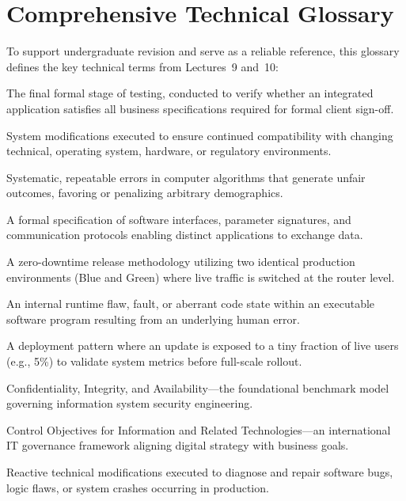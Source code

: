 \documentclass[11pt,a4paper]{article}
\begin{document}
\section{Comprehensive Technical Glossary}
\label{sec:glossary}

To support undergraduate revision and serve as a reliable reference, this glossary defines the key technical terms from Lectures~9 and~10:

\begin{description}[leftmargin=!,labelwidth=4.5cm]
    \item[Acceptance Testing] The final formal stage of testing, conducted to verify whether an integrated application satisfies all business specifications required for formal client sign-off.
    \item[Adaptive Maintenance] System modifications executed to ensure continued compatibility with changing technical, operating system, hardware, or regulatory environments.
    \item[Algorithmic Bias] Systematic, repeatable errors in computer algorithms that generate unfair outcomes, favoring or penalizing arbitrary demographics.
    \item[API (Application Programming Interface)] A formal specification of software interfaces, parameter signatures, and communication protocols enabling distinct applications to exchange data.
    \item[Blue-Green Deployment] A zero-downtime release methodology utilizing two identical production environments (Blue and Green) where live traffic is switched at the router level.
    \item[Bug] An internal runtime flaw, fault, or aberrant code state within an executable software program resulting from an underlying human error.
    \item[Canary Deployment] A deployment pattern where an update is exposed to a tiny fraction of live users (e.g., 5\%) to validate system metrics before full-scale rollout.
    \item[CIA Triad] Confidentiality, Integrity, and Availability---the foundational benchmark model governing information system security engineering.
    \item[COBIT] Control Objectives for Information and Related Technologies---an international IT governance framework aligning digital strategy with business goals.
    \item[Corrective Maintenance] Reactive technical modifications executed to diagnose and repair software bugs, logic flaws, or system crashes occurring in production.

\end{description}
\end{document}

